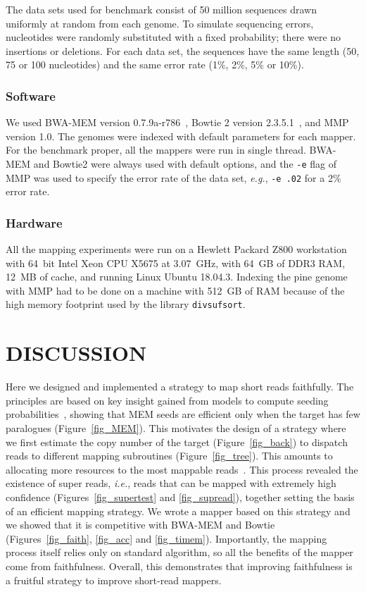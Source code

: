 \documentclass[a4,center,fleqn]{NAR}
\begin{document}
The data sets used for benchmark consist of 50 million sequences drawn
uniformly at random from each genome. To simulate sequencing errors,
nucleotides were randomly substituted with a fixed probability; there were
no insertions or deletions. For each data set, the sequences have the same
length (50, 75 or 100 nucleotides) and the same error rate (1\%, 2\%, 5\%
or 10\%).

\subsubsection{Software}

We used BWA-MEM version 0.7.9a-r786~\cite{li2013aligning}, Bowtie 2
version 2.3.5.1~\cite{pmid22388286}, and MMP version 1.0. The genomes were
indexed with default parameters for each mapper. For the benchmark proper,
all the mappers were run in single thread. BWA-MEM and Bowtie2 were always
used with default options, and the \texttt{-e} flag of MMP was used to
specify the error rate of the data set, \textit{e.g.}, \texttt{-e .02} for
a 2\% error rate.

\subsubsection{Hardware}

All the mapping experiments were run on a Hewlett Packard Z800 workstation
with 64~bit Intel Xeon CPU X5675 at 3.07~GHz, with 64~GB of DDR3 RAM,
12~MB of cache, and running Linux Ubuntu 18.04.3. Indexing the pine genome
with MMP had to be done on a machine with 512~GB of RAM because of the
high memory footprint used by the library \texttt{divsufsort}.


\section{DISCUSSION}

Here we designed and implemented a strategy to map short reads faithfully.
The principles are based on key insight gained from models to compute
seeding probabilities~\cite{Filion619155}, showing that MEM seeds are
efficient only when the target has few paralogues (Figure~\ref{fig_MEM}).
This motivates the design of a strategy where we first estimate the copy
number of the target (Figure~\ref{fig_back}) to dispatch reads to
different mapping subroutines (Figure~\ref{fig_tree}). This amounts to
allocating more resources to the most mappable reads~\cite{pmid22276185}.
This process revealed the existence of super reads, \textit{i.e.}, reads
that can be mapped with extremely high confidence
(Figures~\ref{fig_supertest} and \ref{fig_supread}), together setting the
basis of an efficient mapping strategy. We wrote a mapper based on this
strategy and we showed that it is competitive with BWA-MEM and Bowtie
(Figures~\ref{fig_faith}, \ref{fig_acc} and \ref{fig_timem}). Importantly,
the mapping process itself relies only on standard algorithm, so all the
benefits of the mapper come from faithfulness. Overall, this demonstrates
that improving faithfulness is a fruitful strategy to improve short-read
mappers.
\end{document}
